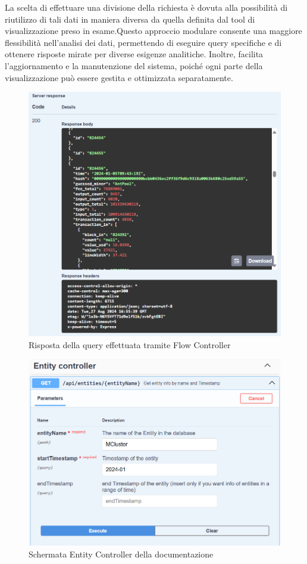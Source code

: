La scelta di effettuare una divisione della richiesta è dovuta alla possibilità di riutilizzo di tali dati in maniera diversa da quella definita dal tool di visualizzazione preso in esame.Questo approccio modulare consente una maggiore flessibilità nell’analisi dei dati, permettendo di eseguire query specifiche e di ottenere risposte mirate per diverse esigenze analitiche. Inoltre, facilita l’aggiornamento e la manutenzione del sistema, poiché ogni parte della visualizzazione può essere gestita e ottimizzata separatamente.
\thispagestyle{mystyle}
\begin{figure}[H]
    \centering \includegraphics[keepaspectratio=true,scale=0.45]{Images/responseVisController.png}
    \caption{Risposta della query effettuata tramite Flow Controller}
\end{figure}


\begin{figure}[H]
    \centering \includegraphics[keepaspectratio=true,scale=0.4]{Images/EntityControllerSwaggerTest.png}
    \caption{Schermata Entity Controller della documentazione}
    
    \thispagestyle{mystyle}
\end{figure}

